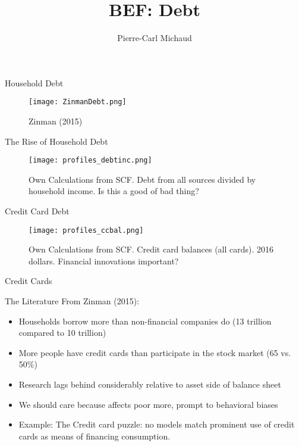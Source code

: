 \documentclass[theme=default]{beamer}
\title{BEF: Debt}
\author{Pierre-Carl Michaud}
\begin{document}
\maketitle



\begin{frame}{Household Debt}
\begin{figure}
\texttt{[image: ZinmanDebt.png]}
\caption{Zinman (2015)}
\end{figure}
\end{frame}

\begin{frame}{The Rise of Household Debt}
\begin{figure}
\texttt{[image: profiles\_debtinc.png]}
\caption{Own Calculations from SCF. Debt from all sources divided by household income. Is this a good of bad thing? }
\end{figure}
\end{frame}

\begin{frame}{Credit Card Debt}
\begin{figure}
\texttt{[image: profiles\_ccbal.png]}
\caption{Own Calculations from SCF. Credit card balances (all cards). 2016 dollars. Financial innovations important?}
\end{figure}
\end{frame}

\begin{frame}{Credit Cards}
\begin{table}[htbp]
\centering
\footnotesize

\caption{Statistics on credit card debt held by those age 51-61 in SCF for various years. Weighted using sampling weights provided in SCF. Own calculations. Huge variation in APRs.}
\end{table}

\end{frame}

\begin{frame}{The Literature}
From Zinman (2015):
\begin{itemize}
\item Households borrow more than non-financial companies do (13 trillion compared to 10 trillion)
\item More people have credit cards than participate in the stock market (65 vs. 50\%)
\item Research lags behind considerably relative to asset side of balance sheet
\item We should care because affects poor more, prompt to behavioral biases
\item Example: The Credit card puzzle: no models match prominent use of credit cards as means of financing consumption. 
\end{itemize}
\end{frame}
\end{document}

